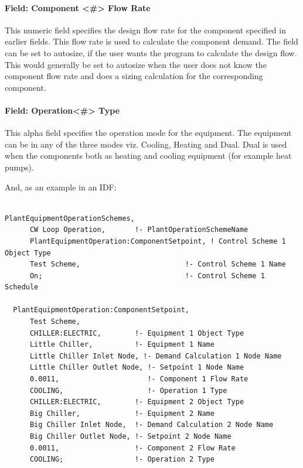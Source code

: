 \paragraph{Field: Component \textless{}\#\textgreater{} Flow Rate}\label{field-component-flow-rate}

This numeric field specifies the design flow rate for the component specified in earlier fields. This flow rate is used to calculate the component demand. The field can be set to autosize, if the user wants the program to calculate the design flow. This would generally be set to autosize when the user does not know the component flow rate and does a sizing calculation for the corresponding component.

\paragraph{Field: Operation\textless{}\#\textgreater{} Type}\label{field-operation-type}

This alpha field specifies the operation mode for the equipment. The equipment can be in any of the three modes viz. Cooling, Heating and Dual. Dual is used when the components both as heating and cooling equipment (for example heat pumps).

And, as an example in an IDF:

\begin{lstlisting}

PlantEquipmentOperationSchemes,
      CW Loop Operation,       !- PlantOperationSchemeName
      PlantEquipmentOperation:ComponentSetpoint, ! Control Scheme 1 Object Type
      Test Scheme,                         !- Control Scheme 1 Name
      On;                                  !- Control Scheme 1 Schedule

  PlantEquipmentOperation:ComponentSetpoint,
      Test Scheme,
      CHILLER:ELECTRIC,        !- Equipment 1 Object Type
      Little Chiller,          !- Equipment 1 Name
      Little Chiller Inlet Node, !- Demand Calculation 1 Node Name
      Little Chiller Outlet Node, !- Setpoint 1 Node Name
      0.0011,                     !- Component 1 Flow Rate
      COOLING,                    !- Operation 1 Type
      CHILLER:ELECTRIC,        !- Equipment 2 Object Type
      Big Chiller,             !- Equipment 2 Name
      Big Chiller Inlet Node,  !- Demand Calculation 2 Node Name
      Big Chiller Outlet Node, !- Setpoint 2 Node Name
      0.0011,                  !- Component 2 Flow Rate
      COOLING;                 !- Operation 2 Type
\end{lstlisting}

